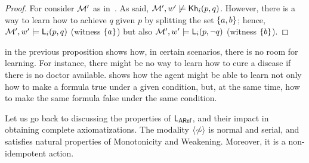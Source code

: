 \begin{proof}
For  consider $\mathcal{M}'$ as in~.
As said, $\mathcal{M}',w'\not\models{\sf Kh}_i(p,q)$.
However, there is a way to learn how to achieve $q$ given $p$ by splitting the set $\{ a,b \}$; hence, $\mathcal{M}',w'\models {\sf L}_i(p,q)$ (witness $\{ a \}$) but also $\mathcal{M}',w'\models{\sf L}_i(p,\neg q)$ (witness $\{ b \}$).
\end{proof}

 in the previous proposition shows how, in certain scenarios, there is
no room for learning. For instance, there might be no way to learn how
to cure a disease if there is no doctor
available.  shows how the agent might be able
to learn not only how to make a formula true under a given condition,
but, at the same time, how to make the same formula false under the same condition.

Let us go back to discussing the properties of $\mathsf{L_{ARef}}$, and their impact in obtaining complete axiomatizations. The modality $\langle \not\sim \rangle$ is normal and serial, and satisfies  natural properties 
of Monotonicity and Weakening. Moreover, it is a non-idempotent action. 


\medskip 


